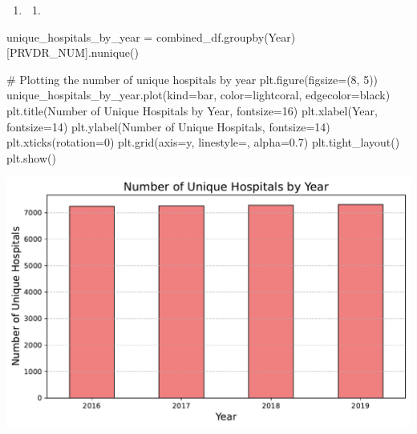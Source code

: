 \documentclass[
  letterpaper,
  DIV=11,
  numbers=noendperiod]{scrartcl}
\newenvironment{Shaded}{\begin{snugshade}}{\end{snugshade}}
\newcommand{\CommentTok}[1]{\textcolor[rgb]{0.37,0.37,0.37}{#1}}
\newcommand{\DecValTok}[1]{\textcolor[rgb]{0.68,0.00,0.00}{#1}}
\newcommand{\FloatTok}[1]{\textcolor[rgb]{0.68,0.00,0.00}{#1}}
\newcommand{\NormalTok}[1]{\textcolor[rgb]{0.00,0.23,0.31}{#1}}
\newcommand{\OperatorTok}[1]{\textcolor[rgb]{0.37,0.37,0.37}{#1}}
\newcommand{\StringTok}[1]{\textcolor[rgb]{0.13,0.47,0.30}{#1}}
\providecommand{\tightlist}{%
  \setlength{\itemsep}{0pt}\setlength{\parskip}{0pt}}\usepackage{longtable,booktabs,array}
\begin{document}
\begin{enumerate}
\def\labelenumi{\arabic{enumi}.}
\setcounter{enumi}{3}
\tightlist
\item
  \begin{enumerate}
  \def\labelenumii{\alph{enumii}.}
  \tightlist
  \item
  \end{enumerate}
\end{enumerate}

\begin{Shaded}
\begin{Highlighting}[]
\NormalTok{unique\_hospitals\_by\_year }\OperatorTok{=}\NormalTok{ combined\_df.groupby(}\StringTok{\textquotesingle{}Year\textquotesingle{}}\NormalTok{)[}\StringTok{\textquotesingle{}PRVDR\_NUM\textquotesingle{}}\NormalTok{].nunique()}

\CommentTok{\# Plotting the number of unique hospitals by year}
\NormalTok{plt.figure(figsize}\OperatorTok{=}\NormalTok{(}\DecValTok{8}\NormalTok{, }\DecValTok{5}\NormalTok{))}
\NormalTok{unique\_hospitals\_by\_year.plot(kind}\OperatorTok{=}\StringTok{\textquotesingle{}bar\textquotesingle{}}\NormalTok{, color}\OperatorTok{=}\StringTok{\textquotesingle{}lightcoral\textquotesingle{}}\NormalTok{, edgecolor}\OperatorTok{=}\StringTok{\textquotesingle{}black\textquotesingle{}}\NormalTok{)}
\NormalTok{plt.title(}\StringTok{\textquotesingle{}Number of Unique Hospitals by Year\textquotesingle{}}\NormalTok{, fontsize}\OperatorTok{=}\DecValTok{16}\NormalTok{)}
\NormalTok{plt.xlabel(}\StringTok{\textquotesingle{}Year\textquotesingle{}}\NormalTok{, fontsize}\OperatorTok{=}\DecValTok{14}\NormalTok{)}
\NormalTok{plt.ylabel(}\StringTok{\textquotesingle{}Number of Unique Hospitals\textquotesingle{}}\NormalTok{, fontsize}\OperatorTok{=}\DecValTok{14}\NormalTok{)}
\NormalTok{plt.xticks(rotation}\OperatorTok{=}\DecValTok{0}\NormalTok{)}
\NormalTok{plt.grid(axis}\OperatorTok{=}\StringTok{\textquotesingle{}y\textquotesingle{}}\NormalTok{, linestyle}\OperatorTok{=}\StringTok{\textquotesingle{}{-}{-}\textquotesingle{}}\NormalTok{, alpha}\OperatorTok{=}\FloatTok{0.7}\NormalTok{)}
\NormalTok{plt.tight\_layout()}
\NormalTok{plt.show()}
\end{Highlighting}
\end{Shaded}

\includegraphics{pset4_ANSWERS_files/figure-pdf/cell-7-output-1.pdf}
\end{document}

